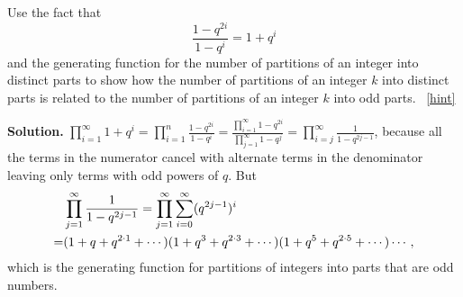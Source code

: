 \documentclass{book}
\begin{document}
\setcounter{project}{324}
\addtocounter{project}{-1}
\begin{activity}[]\label{activity-317}
\hypertarget{p-1677}{}%
Use the fact that%
\begin{equation*}
\frac{1-q^{2i}}{1-q^i}= 1+q^i
\end{equation*}
and the generating function for the number of partitions of an integer into distinct parts to show how the number of partitions of an integer \(k\) into distinct parts is related to the number of partitions of an integer \(k\) into odd parts.%
~\hfill{\tiny\hyperlink{a-324}{[hint]}\hypertarget{q-324}{}}\par\smallskip%
\noindent\textbf{Solution.}\hypertarget{solution-262}{}\quad%
\hypertarget{p-1679}{}%
\(\displaystyle\prod_{i=1}^\infty 1+q^i=\prod_{i=1}^n \frac{1-q^{2i}}{1-q^i}=\frac{\prod_{i=1}^\infty1-q^{2i}}{\prod_{j=1}^\infty 1-q^j} =\prod_{i=j}^\infty \frac{1}{1-q^{2j-1}}\), because all the terms in the numerator cancel with alternate terms in the denominator leaving only terms with odd powers of \(q\). But%
\begin{align*}
& \prod_{j=1}^\infty\frac{1}{1-q^{2j-1}} =  \prod_{j=1}^\infty \sum_{i=0}^\infty (q^{2j-1})^i\\
=& (1+q+q^{2\cdot1}+\cdots)(1+q^3+q^{2\cdot3}+\cdots)(1
+q^5+q^{2\cdot5}+\cdots)\cdots,
\end{align*}
which is the generating function for partitions of integers into parts that are odd numbers.%
\end{activity}
\end{document}
